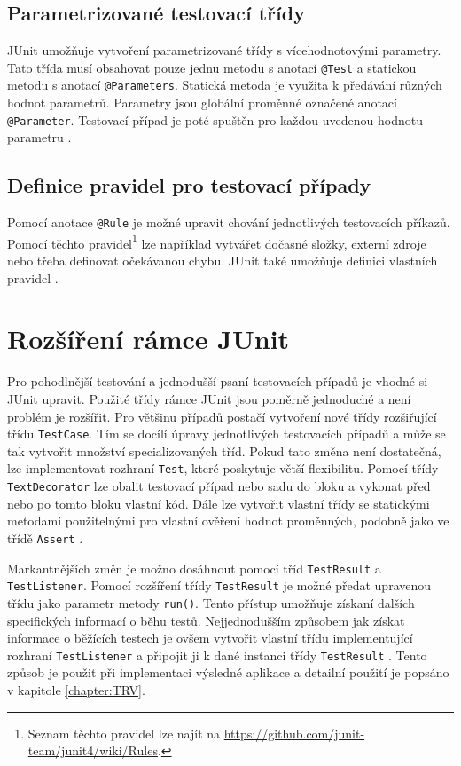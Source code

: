     \subsection{Parametrizované testovací třídy}
    JUnit umožňuje vytvoření parametrizované třídy s vícehodnotovými parametry. Tato třída musí obsahovat pouze jednu metodu s anotací \texttt{@Test} a statickou metodu s anotací \texttt{@Parameters}. Statická metoda je využita k předávání různých hodnot parametrů. Parametry jsou globální proměnné označené anotací \texttt{@Parameter}. Testovací případ je poté spuštěn pro každou uvedenou hodnotu parametru \cite{vogella:JUnit}.

    \subsection{Definice pravidel pro testovací případy}
    Pomocí anotace \texttt{@Rule} je možné upravit chování jednotlivých testovacích příkazů. Pomocí těchto pravidel\footnote{Seznam těchto pravidel lze najít na \url{https://github.com/junit-team/junit4/wiki/Rules}.} lze například vytvářet dočasné složky, externí zdroje nebo třeba definovat očekávanou chybu. JUnit také umožňuje definici vlastních pravidel \cite{vogella:JUnit}.

  \section{Rozšíření rámce JUnit}
  Pro pohodlnější testování a jednodušší psaní testovacích případů je vhodné si JUnit upravit. Použité třídy rámce JUnit jsou poměrně jednoduché a není problém je rozšířit. Pro většinu případů postačí vytvoření nové třídy rozšiřující třídu \texttt{TestCase}. Tím se docílí úpravy jednotlivých testovacích případů a může se tak vytvořit množství specializovaných tříd. Pokud tato změna není dostatečná, lze implementovat rozhraní \texttt{Test}, které poskytuje větší flexibilitu. Pomocí třídy \texttt{TextDecorator} lze obalit testovací případ nebo sadu do bloku a vykonat před nebo po tomto bloku vlastní kód. Dále lze vytvořit vlastní třídy se statickými metodami použitelnými pro vlastní ověření hodnot proměnných, podobně jako ve třídě \texttt{Assert} \cite{JUnitGuide}.

  Markantnějších změn je možno dosáhnout pomocí tříd \texttt{TestResult} a \texttt{TestListener}. Pomocí rozšíření třídy \texttt{TestResult} je možné předat upravenou třídu jako parametr metody \texttt{run()}. Tento přístup umožňuje získaní dalších specifických informací o běhu testů. Nejjednodušším způsobem jak získat informace o běžících testech je ovšem vytvořit vlastní třídu implementující rozhraní \texttt{TestListener} a připojit ji k dané instanci třídy \texttt{TestResult} \cite{JUnitGuide}. Tento způsob je použit při implementaci výsledné aplikace a detailní použití je popsáno v kapitole \ref{chapter:TRV}.

